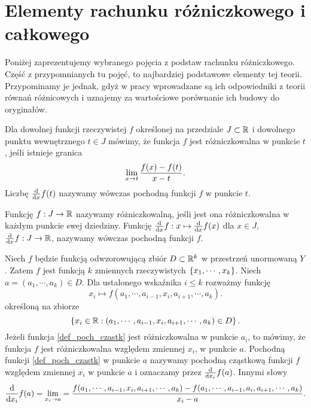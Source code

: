 \documentclass[12pt,a4paper]{report}
\begin{document}
\section{Elementy rachunku różniczkowego i całkowego}

Poniżej zaprezentujemy wybranego pojęcia z podstaw rachunku różniczkowego. Część z przypomnianych tu pojęć, to najbardziej podstawowe elementy tej teorii. Przypominamy je jednak, gdyż w pracy wprowadzane są ich odpowiedniki z teorii równań różnicowych i uznajemy za wartościowe porównanie ich budowy do oryginałów. 

\begin{definition}
Dla dowolnej funkcji rzeczywistej $f$ określonej na przedziale $J \subset \mathbb{R} $ i dowolnego punktu wewnętrznego $ t \in J$ mówimy, że funkcja $f$ jest różniczkowalna w punkcie $t$, jeśli istnieje granica
$$
\limit_{x \to t}  \frac{f(x) - f(t)}{x-t}.
$$
Liczbę $\frac{\mathrm{d} {} }{\mathrm{d}{x}}f(t)$ nazywamy wówczas pochodną funkcji $f$ w punkcie $t$.  
\end{definition}
\begin{definition}
Funkcję $ f: J \to \mathbb{R} $ nazywamy różniczkowalną, jeśli jest ona różniczkowalna w każdym punkcie swej dziedziny. Funkcję $\frac{\mathrm{d} {} }{\mathrm{d}{x}}f: x \mapsto \frac{\mathrm{d} {} }{\mathrm{d}{x}}f(x)$ dla $x \in J$,  $\frac{\mathrm{d} {} }{\mathrm{d}{x}}f : J \to \mathbb{R} $, nazywamy wówczas pochodną funkcji $f$. 
\end{definition}

\begin{definition}
Niech $f$ będzie funkcją odwzorowującą zbiór $D \subset \mathbb{R}^k $ w przestrzeń unormowaną $Y$. Zatem $f$ jest funkcją $k$ zmiennych rzeczywistych $\left\lbrace {x_1,\cdots,x_k} \right\rbrace$. Niech $a=(a_1,\cdots,a_k) \in D $. Dla ustalonego wskaźnika $i \leq k$ rozważmy funkcję 
\begin{equation}\label{def_poch_czastk}
x_i \mapsto f(a_1,\cdots,a_{i-1},x_i,a_{i+1},\cdots,a_k).
\end{equation}
określoną na zbiorze 
$$
\left\lbrace {x_i \in \mathbb{R}: (a_1,\cdots,a_{i-1},x_i,a_{i+1},\cdots,a_k) \in D} \right\rbrace.
$$
Jeżeli funkcja \eqref{def_poch_czastk} jest różniczkowalna w punkcie $a_i$, to mówimy, że funkcja $f$ jest różniczkowalna względem zmiennej $x_i$, w punkcie $a$. Pochodną funkcji \eqref{def_poch_czastk} w punkcie $a$ nazywamy pochodną cząstkową funkcji $f$ względem zmiennej $x_i$ w punkcie $a$ i oznaczamy przez $\frac{\mathrm{d} {} }{\mathrm{d}{x_i}} f(a) $. Innymi słowy 
\begin{equation}
\ddx{x_i} f(a) = \lim_{x_i \to a} = \frac{f(a_1,\cdots,a_{i-1},x_i,a_{i+1},\cdots,a_k) - f(a_1,\cdots,a_{i-1},a_i,a_{i+1},\cdots,a_k)}{x_i - a} .
\end{equation}
\end{definition}
\end{document}
